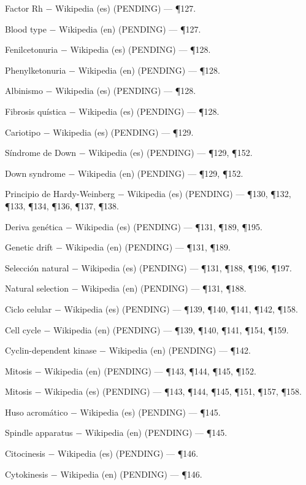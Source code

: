 \documentclass{book}
\begin{document}
\noindent Factor Rh \(-\) Wikipedia (es) (PENDING) --- \P127.

\noindent Blood type \(-\) Wikipedia (en) (PENDING) --- \P127.

\noindent Fenilcetonuria \(-\) Wikipedia (es) (PENDING) --- \P128.

\noindent Phenylketonuria \(-\) Wikipedia (en) (PENDING) --- \P128.

\noindent Albinismo \(-\) Wikipedia (es) (PENDING) --- \P128.

\noindent Fibrosis quística \(-\) Wikipedia (es) (PENDING) --- \P128.

\noindent Cariotipo \(-\) Wikipedia (es) (PENDING) --- \P129.

\noindent Síndrome de Down \(-\) Wikipedia (es) (PENDING) --- \P129, \P152.

\noindent Down syndrome \(-\) Wikipedia (en) (PENDING) --- \P129, \P152.

\noindent Principio de Hardy-Weinberg \(-\) Wikipedia (es) (PENDING) --- \P130, \P132, \P133, \P134, \P136, \P137, \P138.

\noindent Deriva genética \(-\) Wikipedia (es) (PENDING) --- \P131, \P189, \P195.

\noindent Genetic drift \(-\) Wikipedia (en) (PENDING) --- \P131, \P189.

\noindent Selección natural \(-\) Wikipedia (es) (PENDING) --- \P131, \P188, \P196, \P197.

\noindent Natural selection \(-\) Wikipedia (en) (PENDING) --- \P131, \P188.

\noindent Ciclo celular \(-\) Wikipedia (es) (PENDING) --- \P139, \P140, \P141, \P142, \P158.

\noindent Cell cycle \(-\) Wikipedia (en) (PENDING) --- \P139, \P140, \P141, \P154, \P159.

\noindent Cyclin-dependent kinase \(-\) Wikipedia (en) (PENDING) --- \P142.

\noindent Mitosis \(-\) Wikipedia (en) (PENDING) --- \P143, \P144, \P145, \P152.

\noindent Mitosis \(-\) Wikipedia (es) (PENDING) --- \P143, \P144, \P145, \P151, \P157, \P158.

\noindent Huso acromático \(-\) Wikipedia (es) (PENDING) --- \P145.

\noindent Spindle apparatus \(-\) Wikipedia (en) (PENDING) --- \P145.

\noindent Citocinesis \(-\) Wikipedia (es) (PENDING) --- \P146.

\noindent Cytokinesis \(-\) Wikipedia (en) (PENDING) --- \P146.
\end{document}
